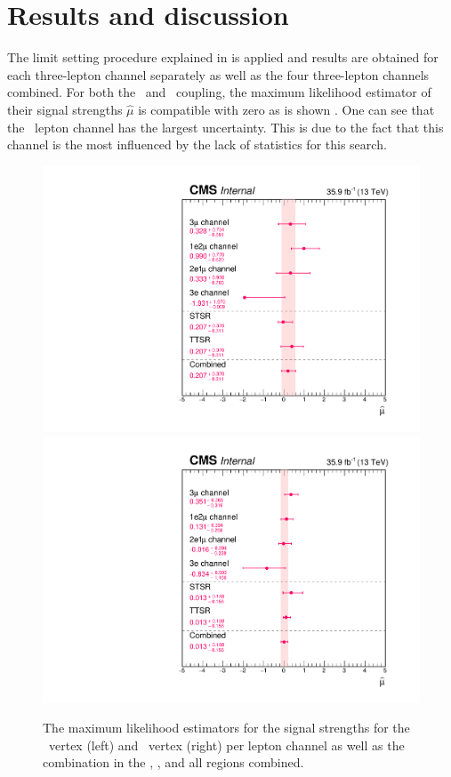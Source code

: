 \newpage
\section{Results and discussion}
\label{sec:Result}
The limit setting procedure explained in  is applied and results are obtained for each three-lepton channel separately as well as the four three-lepton channels combined. For both the \Zut\ and \Zct\ coupling, the maximum likelihood estimator of their signal strengths $\hat{\mu}$ is compatible with zero as is shown . One can see that the \eee\ lepton channel has the largest uncertainty. This is due to the fact that this channel is the most influenced by the lack of statistics for this search.
\begin{figure}[htbp] %
	\centering
	\includegraphics[width=0.49\linewidth]{6_Search/Figures/MLE/MLEZut.pdf}
	\includegraphics[width=0.49\linewidth]{6_Search/Figures/MLE/MLEZct2.pdf}
	\caption{The maximum likelihood estimators for the signal strengths for the \Zut\ vertex (left) and \Zct\ vertex (right) per lepton channel as well as the combination in the \STSR, \TTSR, and all regions combined. }
	\label{fig:mlezut}
\end{figure}

